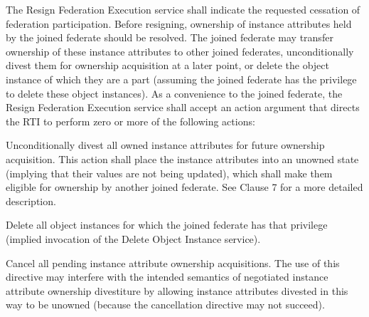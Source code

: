The Resign Federation Execution service shall indicate the requested cessation of federation participation. Before resigning, ownership of instance attributes held by the joined federate should be resolved. The joined federate may transfer ownership of these instance attributes to other joined federates, unconditionally divest them for ownership acquisition at a later point, or delete the object instance of which they are a part (assuming the joined federate has the privilege to delete these object instances). As a convenience to the joined federate, the Resign Federation Execution service shall accept an action argument that directs the RTI to perform zero or more of the following actions:

\begin{stddashlist}
    \item Unconditionally divest all owned instance attributes for future ownership acquisition. This action shall place the instance attributes into an unowned state (implying that their values are not being updated), which shall make them eligible for ownership by another joined federate. See Clause 7 for a more detailed description.
    \item Delete all object instances for which the joined federate has that privilege (implied invocation of the Delete Object Instance service).
    \item Cancel all pending instance attribute ownership acquisitions. The use of this directive may interfere with the intended semantics of negotiated instance attribute ownership divestiture by allowing instance attributes divested in this way to be unowned (because the cancellation directive may not succeed).
\end{stddashlist}

